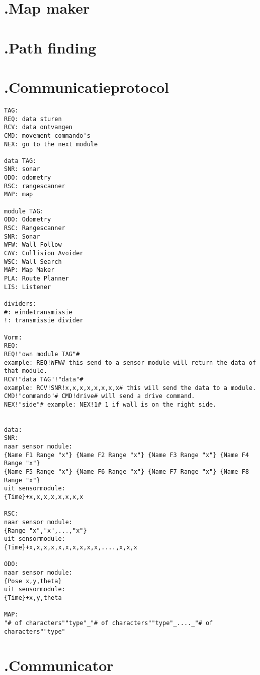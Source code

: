 \documentclass[a4paper,10pt]{article}
\begin{document}
\section*{\label{mapmaker}\thesection.\quad Map maker}

\section*{\label{pathfinding}\thesection.\quad Path finding}

\section*{\label{protocol}\thesection.\quad Communicatieprotocol}
\begin{verbatim}
TAG:
REQ: data sturen
RCV: data ontvangen
CMD: movement commando's
NEX: go to the next module

data TAG:
SNR: sonar
ODO: odometry
RSC: rangescanner
MAP: map

module TAG:
ODO: Odometry
RSC: Rangescanner
SNR: Sonar
WFW: Wall Follow
CAV: Collision Avoider
WSC: Wall Search
MAP: Map Maker
PLA: Route Planner
LIS: Listener

dividers:
#: eindetransmissie
!: transmissie divider

Vorm:
REQ:
REQ!"own module TAG"# 
example: REQ!WFW# this send to a sensor module will return the data of that module.
RCV!"data TAG"!"data"# 
example: RCV!SNR!x,x,x,x,x,x,x,x# this will send the data to a module.
CMD!"commando"# CMD!drive# will send a drive command.
NEX!"side"# example: NEX!1# 1 if wall is on the right side.


data:
SNR:
naar sensor module:
{Name F1 Range "x"} {Name F2 Range "x"} {Name F3 Range "x"} {Name F4 Range "x"} 
{Name F5 Range "x"} {Name F6 Range "x"} {Name F7 Range "x"} {Name F8 Range "x"}
uit sensormodule:
{Time}+x,x,x,x,x,x,x,x

RSC:
naar sensor module:
{Range "x","x",...,"x"}
uit sensormodule:
{Time}+x,x,x,x,x,x,x,x,x,x,....,x,x,x

ODO:
naar sensor module:
{Pose x,y,theta}
uit sensormodule:
{Time}+x,y,theta

MAP:
"# of characters""type"_"# of characters""type"_...._"# of characters""type"
\end{verbatim}

\section*{\label{communicator}\thesection.\quad Communicator}
\end{document}
